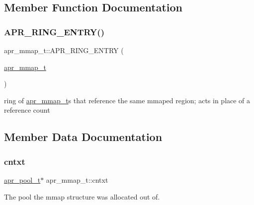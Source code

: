 \subsection{Member Function Documentation}
\mbox{\label{structapr__mmap__t_aeca30aed7539548d31b7c0115020af62}} 
\subsubsection{\texorpdfstring{A\+P\+R\+\_\+\+R\+I\+N\+G\+\_\+\+E\+N\+T\+R\+Y()}{APR\_RING\_ENTRY()}}
{\footnotesize\ttfamily apr\+\_\+mmap\+\_\+t\+::\+A\+P\+R\+\_\+\+R\+I\+N\+G\+\_\+\+E\+N\+T\+RY (\begin{DoxyParamCaption}\item[{\mbox{\hyperlink{structapr__mmap__t}{apr\+\_\+mmap\+\_\+t}}}]{ }\end{DoxyParamCaption})}

ring of \mbox{\hyperlink{structapr__mmap__t}{apr\+\_\+mmap\+\_\+t}}\textquotesingle{}s that reference the same mmap\textquotesingle{}ed region; acts in place of a reference count 

\subsection{Member Data Documentation}
\mbox{\label{structapr__mmap__t_a42d01080278bbc9bad26728f9a71c492}} 
\subsubsection{\texorpdfstring{cntxt}{cntxt}}
{\footnotesize\ttfamily \mbox{\hyperlink{group__apr__pools_gaf137f28edcf9a086cd6bc36c20d7cdfb}{apr\+\_\+pool\+\_\+t}}$\ast$ apr\+\_\+mmap\+\_\+t\+::cntxt}

The pool the mmap structure was allocated out of. \mbox{\label{structapr__mmap__t_abcc62d7e7c8187311e6619faf0d44f19}} 
